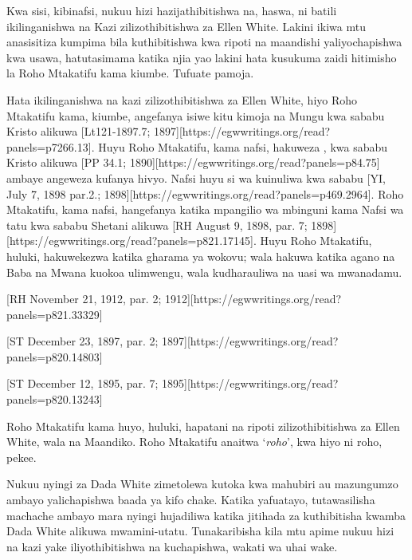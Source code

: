 Kwa sisi, kibinafsi, nukuu hizi hazijathibitishwa na, haswa, ni batili ikilinganishwa na Kazi zilizothibitishwa za Ellen White. Lakini ikiwa mtu anasisitiza kumpima bila kuthibitishwa kwa ripoti na maandishi yaliyochapishwa kwa usawa, hatutasimama katika njia yao lakini hata kusukuma zaidi hitimisho la Roho Mtakatifu kama kiumbe. Tufuate pamoja.

Hata ikilinganishwa na kazi zilizothibitishwa za Ellen White, hiyo Roho Mtakatifu kama, kiumbe, angefanya isiwe kitu kimoja na Mungu kwa sababu Kristo alikuwa [Lt121-1897.7; 1897][https://egwwritings.org/read?panels=p7266.13]. Huyu Roho Mtakatifu, kama nafsi, hakuweza , kwa sababu Kristo alikuwa [PP 34.1; 1890][https://egwwritings.org/read?panels=p84.75] ambaye angeweza kufanya hivyo. Nafsi huyu si wa kuinuliwa kwa sababu [YI, July 7, 1898 par.2.; 1898][https://egwwritings.org/read?panels=p469.2964]. Roho Mtakatifu, kama nafsi, hangefanya katika mpangilio wa mbinguni kama Nafsi wa tatu kwa sababu Shetani alikuwa [RH August 9, 1898, par. 7; 1898][https://egwwritings.org/read?panels=p821.17145]. Huyu Roho Mtakatifu, huluki, hakuwekezwa katika gharama ya wokovu; wala hakuwa katika agano na Baba na Mwana kuokoa ulimwengu, wala kudharauliwa na uasi wa mwanadamu.

[RH November 21, 1912, par. 2; 1912][https://egwwritings.org/read?panels=p821.33329]

[ST December 23, 1897, par. 2; 1897][https://egwwritings.org/read?panels=p820.14803]

[ST December 12, 1895, par. 7; 1895][https://egwwritings.org/read?panels=p820.13243]

Roho Mtakatifu kama huyo, huluki, hapatani na ripoti zilizothibitishwa za Ellen White, wala na Maandiko. Roho Mtakatifu anaitwa ‘\textit{roho}’, kwa hiyo ni roho, pekee.

Nukuu nyingi za Dada White zimetolewa kutoka kwa mahubiri au mazungumzo ambayo yalichapishwa baada ya kifo chake. Katika yafuatayo, tutawasilisha machache ambayo mara nyingi hujadiliwa katika jitihada za kuthibitisha kwamba Dada White alikuwa mwamini-utatu. Tunakaribisha kila mtu apime nukuu hizi na kazi yake iliyothibitishwa na kuchapishwa, wakati wa uhai wake.

